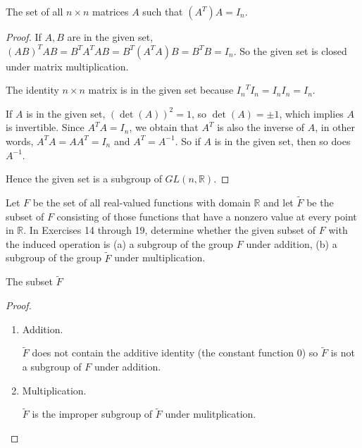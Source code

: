 \newpage

\begin{exercise}
    The set of all $n\times n$ matrices $A$ such that $(A^{T})A = I_{n}$.
\end{exercise}

\begin{proof}
    If $A, B$ are in the given set, ${(AB)}^{T}AB = B^{T}A^{T}AB = B^{T}(A^{T}A)B = B^{T}B = I_{n}$. So the given set is closed under matrix multiplication.

    The identity $n\times n$ matrix is in the given set because ${I_{n}}^{T}I_{n} = I_{n}I_{n} = I_{n}$.

    If $A$ is in the given set, ${(\det(A))}^{2} = 1$, so $\det(A) = \pm 1$, which implies $A$ is invertible. Since $A^{T}A = I_{n}$, we obtain that $A^{T}$ is also the inverse of $A$, in other words, $A^{T}A = AA^{T} = I_{n}$ and $A^{T} = A^{-1}$. So if $A$ is in the given set, then so does $A^{-1}$.

    Hence the given set is a subgroup of $GL(n, \mathbb{R})$.
\end{proof}

Let $F$ be the set of all real-valued functions with domain $\mathbb{R}$ and let $\tilde{F}$ be the subset of $F$ consisting of those functions that have a nonzero value at every point in $\mathbb{R}$. In Exercises 14 through 19, determine whether the given subset of $F$ with the induced operation is (a) a subgroup of the group $F$ under addition, (b) a subgroup of the group $\tilde{F}$ under multiplication.

\newpage
\begin{exercise}
    The subset $\tilde{F}$
\end{exercise}

\begin{proof}
    \begin{enumerate}[label={(\alph*)}]
        \item Addition.

              $\tilde{F}$ does not contain the additive identity (the constant function $0$) so $\tilde{F}$ is not a subgroup of $F$ under addition.
        \item Multiplication.

              $\tilde{F}$ is the improper subgroup of $\tilde{F}$ under mulitplication.
    \end{enumerate}
\end{proof}

